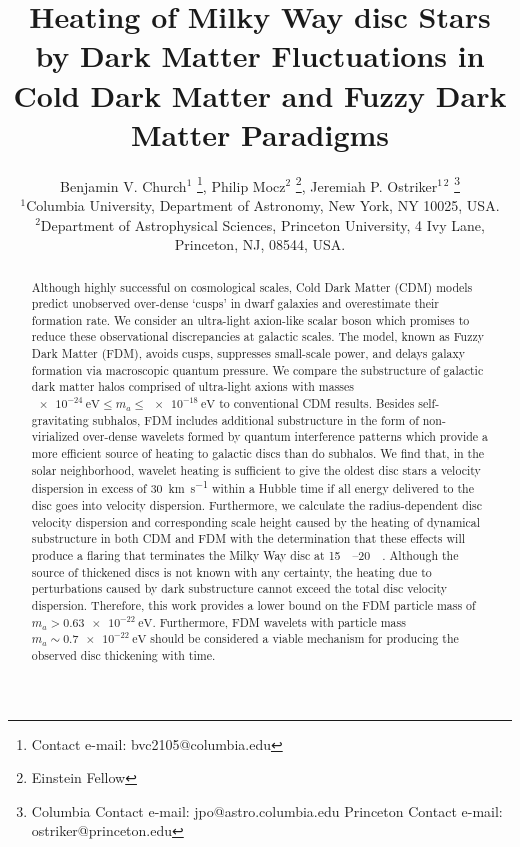 \documentclass[usenatbib]{mnras}
\newcommand{\squote}[1]{\lq #1\rq}
\newcommand{\poweV}[1]{\SI{e#1}{\electronvolt}}
\begin{document}
\title[Dark Matter Heating]{Heating of Milky Way disc Stars by Dark Matter Fluctuations in Cold Dark Matter and Fuzzy Dark Matter Paradigms}
\author[B. V. Church et al.]{
Benjamin V. Church$^{1}$ \thanks{Contact e-mail: bvc2105@columbia.edu}, Philip Mocz$^{2}$ \thanks{Einstein Fellow},
Jeremiah P. Ostriker$^{1 \, 2}$ \thanks{Columbia Contact e-mail: jpo@astro.columbia.edu 
\newline
Princeton Contact e-mail: ostriker@princeton.edu} 
\\
$^{1}$Columbia University, Department of Astronomy, New York, NY 10025, USA.
\\
$^{2}$Department of Astrophysical Sciences, Princeton University, 4 Ivy Lane, Princeton, NJ, 08544, USA.}
\maketitle
\begin{abstract}
Although highly successful on cosmological scales, Cold Dark Matter (CDM) models predict unobserved over-dense \squote{cusps} in dwarf galaxies and overestimate their formation rate. We consider an ultra-light axion-like scalar boson which promises to reduce these observational discrepancies at galactic scales. The model, known as Fuzzy Dark Matter (FDM), avoids cusps, suppresses small-scale power, and delays galaxy formation via macroscopic quantum pressure. We compare the substructure of galactic dark matter halos comprised of ultra-light axions with masses $\poweV{-24} \leq m_a \leq \poweV{-18}$ to conventional CDM results. Besides self-gravitating subhalos, FDM includes additional substructure in the form of non-virialized over-dense wavelets formed by quantum interference patterns which provide a more efficient source of heating to galactic discs than do subhalos. We find that, in the solar neighborhood, wavelet heating is sufficient to give the oldest disc stars a velocity dispersion in excess of \SI{30}{\kilo\meter\per\second} within a Hubble time if all energy delivered to the disc goes into velocity dispersion. 
Furthermore, we calculate the radius-dependent disc velocity dispersion and corresponding scale height caused by the heating of dynamical substructure in both CDM and FDM with the determination that these effects will produce a flaring that terminates the Milky Way disc at \SIrange{15}{20}{\kilo \parsec}. Although the source of thickened discs is not known with any certainty, the heating due to perturbations caused by dark substructure cannot exceed the total disc velocity dispersion. Therefore, this work provides a lower bound on the FDM particle mass of $m_a > \SI{0.63 e-22}{\electronvolt}$. Furthermore, FDM wavelets with particle mass $m_a \sim \SI{0.7e-22}{\electronvolt}$ should be considered a viable mechanism for producing the observed disc thickening with time.
\end{abstract}
\end{document}

